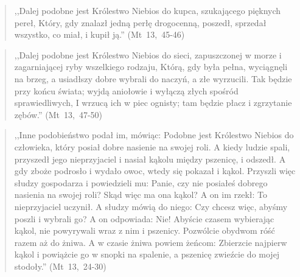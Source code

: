 \documentclass[10pt,a4paper,oneside]{article}
\begin{document}
\begin{quote}
,,Dalej podobne jest Królestwo Niebios do kupca, szukającego pięknych pereł, Który, gdy znalazł jedną perłę drogocenną, poszedł, sprzedał wszystko, co miał, i kupił ją.'' (Mt~13,~45-46)
\end{quote}
\begin{quote}
,,Dalej podobne jest Królestwo Niebios do sieci, zapuszczonej w morze i zagarniającej ryby wszelkiego rodzaju, Którą, gdy była pełna, wyciągnęli na brzeg, a usiadłszy dobre wybrali do naczyń, a złe wyrzucili. Tak będzie przy końcu świata; wyjdą aniołowie i wyłączą złych spośród sprawiedliwych, I wrzucą ich w piec ognisty; tam będzie płacz i zgrzytanie zębów.'' (Mt~13,~47-50)
\end{quote}
\begin{quote}
,,Inne podobieństwo podał im, mówiąc: Podobne jest Królestwo Niebios do człowieka, który posiał dobre nasienie na swojej roli. A kiedy ludzie spali, przyszedł jego nieprzyjaciel i nasiał kąkolu między pszenicę, i odszedł. A gdy zboże podrosło i wydało owoc, wtedy się pokazał i kąkol. Przyszli więc słudzy gospodarza i powiedzieli mu: Panie, czy nie posiałeś dobrego nasienia na swojej roli? Skąd więc ma ona kąkol? A on im rzekł: To nieprzyjaciel uczynił. A słudzy mówią do niego: Czy chcesz więc, abyśmy poszli i wybrali go? A on odpowiada: Nie! Abyście czasem wybierając kąkol, nie powyrywali wraz z nim i pszenicy. Pozwólcie obydwom róść razem aż do żniwa. A w czasie żniwa powiem żeńcom: Zbierzcie najpierw kąkol i powiążcie go w snopki na spalenie, a pszenicę zwieźcie do mojej stodoły.'' (Mt~13,~24-30)
\end{quote}
\end{document}
